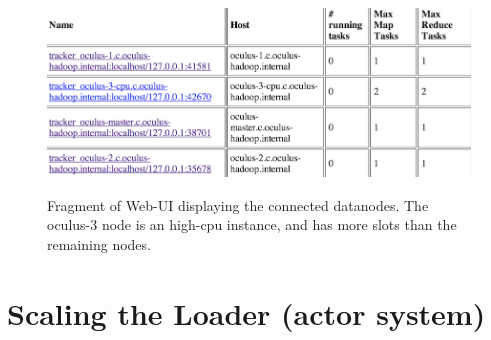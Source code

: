 \begin{figure}[ch!]
  \centering
  \includegraphics[width=\textwidth]{img/hadoop/4node-cluster-config}
  \label{fig:four-nodes-config}
  \caption{Fragment of Web-UI displaying the connected datanodes. The oculus-3 node is an high-cpu instance, and has more slots than the remaining nodes.}
\end{figure}



\section{Scaling the Loader (actor system)}
\label{sec:scaling-akka}

